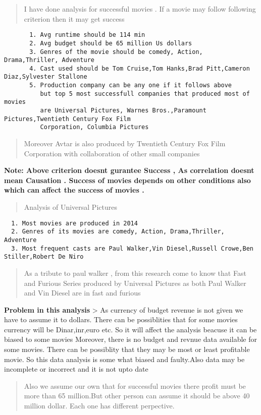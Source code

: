 \documentclass[11pt]{article}
\begin{document}
\begin{quote}
I have done analysis for successful movies . If a movie may follow
following criterion then it may get success
\end{quote}

\begin{verbatim}
       1. Avg runtime should be 114 min
       2. Avg budget should be 65 million Us dollars
       3. Genres of the movie should be comedy, Action, Drama,Thriller, Adventure
       4. Cast used should be Tom Cruise,Tom Hanks,Brad Pitt,Cameron Diaz,Sylvester Stallone  
       5. Production company can be any one if it follows above 
          but top 5 most successfull companies that produced most of movies 
          are Universal Pictures, Warnes Bros.,Paramount Pictures,Twentieth Century Fox Film
          Corporation, Columbia Pictures
\end{verbatim}

\begin{quote}
Moreover Avtar is also produced by Twentieth Century Fox Film
Corporation with collaboration of other small companies
\end{quote}

\textbf{Note: Above criterion doesnt gurantee Success , As correlation
doesnt mean Causation . Success of movies depends on other conditions
also which can affect the success of movies .}

\begin{quote}
Analysis of Universal Pictures
\end{quote}

\begin{verbatim}
  1. Most movies are produced in 2014
  2. Genres of its movies are comedy, Action, Drama,Thriller, Adventure
  3. Most frequent casts are Paul Walker,Vin Diesel,Russell Crowe,Ben Stiller,Robert De Niro    
\end{verbatim}

\begin{quote}
As a tribute to paul walker , from this research come to know that Fast
and Furious Series produced by Universal Pictures as both Paul Walker
and Vin Diesel are in fast and furious
\end{quote}

\textbf{Problem in this analysis} \textgreater{} As currency of budget
revenue is not given we have to assume it to dollars. There can be
possiblities that for some movies currency will be Dinar,inr,euro etc.
So it will affect the analysis beacuse it can be biased to some movies
Moreover, there is no budget and revnue data available for some movies.
There can be possiblity that they may be most or least profitable movie.
So this data analysis is some what biased and faulty.Also data may be
incomplete or incorrect and it is not upto date

\begin{quote}
Also we assume our own that for successful movies there profit must be
more than 65 million.But other person can assume it should be above 40
million dollar. Each one has different perpective.
\end{quote}


    
    
    
    
\end{document}
